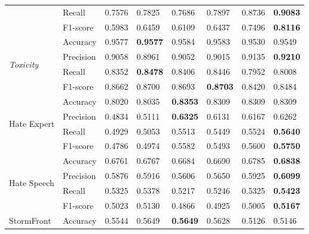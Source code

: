 \begin{table}[]
\begin{minipage}{0.42\paperheight}
{\begin{tabular}{ll|ll|ll|ll}
                                        & Recall    & 0.7576 & 0.7825            & 0.7686      & 0.7897      & 0.8736 & \bf{0.9083}     \\  
                                        & F1-score  & 0.5983 & 0.6459            & 0.6109      & 0.6437      & 0.7496 & \bf{0.8116}     \\ \hline  
    \multirow{4}{*}{\it{Toxicity}}      & Accuracy  & 0.9577 & \bf{0.9577}       & 0.9584      & 0.9583      & 0.9530 & 0.9549          \\  
                                        & Precision & 0.9058 & 0.8961            & 0.9052      & 0.9015      & 0.9135 & \bf{0.9210}     \\  
                                        & Recall    & 0.8352 & \bf{0.8478}       & 0.8406      & 0.8446      & 0.7952 & 0.8008          \\  
                                        & F1-score  & 0.8662 & 0.8700            & 0.8693      & \bf{0.8703} & 0.8420 & 0.8484          \\ \hline  
    \multirow{4}{*}{Hate Expert}        & Accuracy  & 0.8020 & 0.8035            & \bf{0.8353} & 0.8309      & 0.8309 & 0.8309          \\  
                                        & Precision & 0.4834 & 0.5111            & \bf{0.6325} & 0.6131      & 0.6167 & 0.6262          \\  
                                        & Recall    & 0.4929 & 0.5053            & 0.5513      & 0.5449      & 0.5524 & \bf{0.5640}     \\  
                                        & F1-score  & 0.4786 & 0.4974            & 0.5582      & 0.5493      & 0.5600 & \bf{0.5750}     \\ \hline  
    \multirow{4}{*}{Hate Speech}        & Accuracy  & 0.6761 & 0.6767            & 0.6684      & 0.6690      & 0.6785 & \bf{0.6838}     \\  
                                        & Precision & 0.5876 & 0.5916            & 0.5606      & 0.5650      & 0.5925 & \bf{0.6099}     \\  
                                        & Recall    & 0.5325 & 0.5378            & 0.5217      & 0.5246      & 0.5325 & \bf{0.5423}     \\  
                                        & F1-score  & 0.5023 & 0.5130            & 0.4866      & 0.4925      & 0.5005 & \bf{0.5167}     \\ \hline  
    \multirow{4}{*}{StormFront}         & Accuracy  & 0.5544 & 0.5649            & \bf{0.5649} & 0.5628      & 0.5126 & 0.5146          \\  

\end{tabular}}
\end{minipage}
\end{table}
